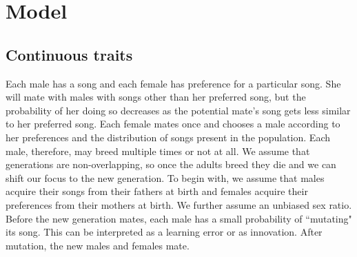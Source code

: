 \documentclass{article}
\begin{document}
\section{Model}

\subsection{Continuous traits }

Each male has a song and each female has preference for a particular song. She will mate with males with songs other than her preferred song, but the probability of her doing so decreases as the potential mate's song gets less similar to her preferred song. Each female mates once and chooses a male according to her preferences and the distribution of songs present in the population. Each male, therefore, may breed multiple times or not at all. We assume that generations are non-overlapping, so once the adults breed they die and we can shift our focus to the new generation. To begin with, we assume that males acquire their songs from their fathers at birth and females acquire their preferences from their mothers at birth. We further assume an unbiased sex ratio. Before the new generation mates, each male has a small probability of ``mutating" its song. This can be interpreted as a learning error or as innovation. After mutation, the new males and females mate. 
\end{document}
